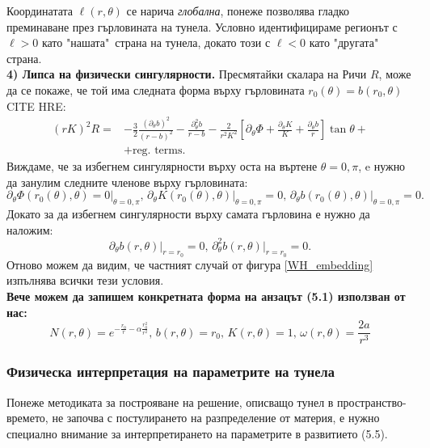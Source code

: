 Координатата $\ell(r,\theta)$ се нарича \emph{глобална}, понеже позволява гладко преминаване през гърловината на тунела. Условно идентифицираме регионът с $\ell >0$ като "нашата"$\,$ страна на тунела, докато този с $\ell < 0$ като "другата"$\,$ страна.\\

\textbf{4) Липса на физически сингулярности.} Пресмятайки скалара на Ричи $R$, може да се покаже, че той има следната форма върху гърловината $r_0(\theta) = b(r_0,\theta)$ CITE HRE:
\begin{equation}
	\begin{aligned}
		(rK)^2R = &-\frac{3}{2}\frac{(\partial_\theta b)^2}{(r - b)^2} - \frac{\partial^2_\theta b}{r - b}
	- \frac{2}{r^2K^2}\left[\partial_\theta \Phi + \frac{\partial_\theta K}{K} + \frac{\partial_\theta b}{r}\right]\tan\theta + \\ 
	& + \text{reg. terms}.
	\end{aligned}
\end{equation}
Виждаме, че за избегнем сингулярности върху оста на въртене $\theta = 0,\pi$, e нужно да занулим следните членове върху гърловината:
\begin{equation}
	\partial_\theta \Phi(r_0(\theta),\theta) = 0\big\vert_{\theta = 0,\pi},\, \partial_\theta K(r_0(\theta),\theta)\big\vert_{\theta = 0,\pi} = 0,\,\partial_\theta b(r_0(\theta),\theta)\big\vert_{\theta = 0,\pi} = 0.
\end{equation}
Докато за да избегнем сингулярности върху самата гърловина е нужно да наложим:
\begin{equation}
	\partial_\theta b(r,\theta)\big\vert_{r = r_0} = 0,\, \partial^2_\theta b(r,\theta)\big\vert_{r = r_0} = 0.
\end{equation}
Отново можем да видим, че частният случай от фигура \ref{WH_embedding} изпълнява всички тези условия.\\

\lfoot{}
\textbf{Вече можем да запишем конкретната форма на анзацът (5.1) използван от нас:}
\begin{equation}
	N(r,\theta) = e^{-\frac{r_0}{r} - \alpha\frac{r_0^2}{r^2}},\, b(r,\theta) = r_0,\, K(r,\theta) = 1,\, \omega(r,\theta) = \frac{2a}{r^3}
\end{equation}
\newpage
\subsubsection{Физическа интерпретация на параметрите на тунела}

Понеже методиката за построяване на решение, описващо тунел в пространство-времето, не започва с постулирането на разпределение от материя, е нужно специално внимание за интерпретирането на параметрите в развитието (5.5).\\

